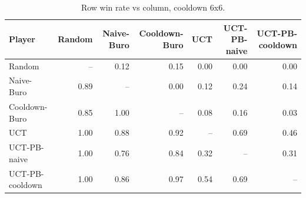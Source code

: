 \begin{table}[H]
\centering
\small
\begin{tabular}{lrrrrrr}
\toprule
Player & Random & Naive-Buro & Cooldown-Buro & UCT & UCT-PB-naive & UCT-PB-cooldown \\
\midrule
Random & -- & 0.12 & 0.15 & 0.00 & 0.00 & 0.00 \\
Naive-Buro & 0.89 & -- & 0.00 & 0.12 & 0.24 & 0.14 \\
Cooldown-Buro & 0.85 & 1.00 & -- & 0.08 & 0.16 & 0.03 \\
UCT & 1.00 & 0.88 & 0.92 & -- & 0.69 & 0.46 \\
UCT-PB-naive & 1.00 & 0.76 & 0.84 & 0.32 & -- & 0.31 \\
UCT-PB-cooldown & 1.00 & 0.86 & 0.97 & 0.54 & 0.69 & -- \\
\bottomrule
\end{tabular}
\caption{Row win rate vs column, cooldown 6x6.}
\label{tab:winrate_cooldown}
\end{table}